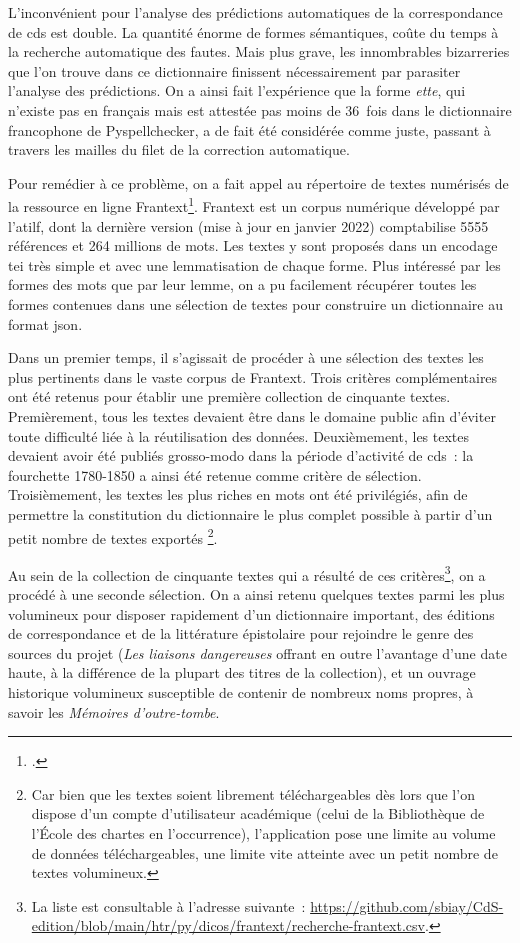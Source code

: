 \documentclass[a4paper,12pt,twoside]{book}
\begin{document}
				L'inconvénient pour l'analyse des \glspl{prédiction} automatiques de la correspondance de \gls{cds} est double. La quantité énorme de formes sémantiques, coûte du temps à la recherche automatique des fautes. Mais plus grave, les innombrables bizarreries que l'on trouve dans ce dictionnaire finissent nécessairement par parasiter l'analyse des \glspl{prédiction}. On a ainsi fait l'expérience que la forme \textit{ette}, qui n'existe pas en français mais est attestée pas moins de 36~fois dans le dictionnaire francophone de Pyspellchecker, a de fait été considérée comme juste, passant à travers les mailles du filet de la correction automatique.
				
				Pour remédier à ce problème, on a fait appel au répertoire de textes numérisés de la ressource en ligne Frantext\footcite{Frantext}. Frantext est un corpus numérique développé par l'\gls{atilf}, dont la dernière version (mise à jour en janvier 2022) comptabilise 5555 références et 264 millions de mots. Les textes y sont proposés dans un encodage \gls{tei} très simple et avec une lemmatisation de chaque forme. Plus intéressé par les formes des mots que par leur lemme, on a pu facilement récupérer toutes les formes contenues dans une sélection de textes pour construire un dictionnaire au format \gls{json}.
				
				Dans un premier temps, il s'agissait de procéder à une sélection des textes les plus pertinents dans le vaste corpus de Frantext. Trois critères complémentaires ont été retenus pour établir une première collection de cinquante textes. Premièrement, tous les textes devaient être dans le domaine public afin d'éviter toute difficulté liée à la réutilisation des données. Deuxièmement, les textes devaient avoir été publiés grosso-modo dans la période d'activité de \gls{cds}~: la fourchette 1780-1850 a ainsi été retenue comme critère de sélection. Troisièmement, les textes les plus riches en mots ont été privilégiés, afin de permettre la constitution du dictionnaire le plus complet possible à partir d'un petit nombre de textes exportés
				\footnote{Car bien que les textes soient librement téléchargeables dès lors que l'on dispose d'un compte d'utilisateur académique (celui de la Bibliothèque de l'École des chartes en l'occurrence), l'application pose une limite au volume de données téléchargeables, une limite vite atteinte avec un petit nombre de textes volumineux.}. 
				
				Au sein de la collection de cinquante textes qui a résulté de ces critères\footnote{La liste est consultable à l'adresse suivante~: \url{https://github.com/sbiay/CdS-edition/blob/main/htr/py/dicos/frantext/recherche-frantext.csv}.}, on a procédé à une seconde sélection. On a ainsi retenu quelques textes parmi les plus volumineux pour disposer rapidement d'un dictionnaire important, des éditions de correspondance et de la littérature épistolaire pour rejoindre le genre des sources du projet (\textit{Les liaisons dangereuses} offrant en outre l'avantage d'une date haute, à la différence de la plupart des titres de la collection), et un ouvrage historique volumineux susceptible de contenir de nombreux noms propres, à savoir les \textit{Mémoires d'outre-tombe}.
				
\end{document}
